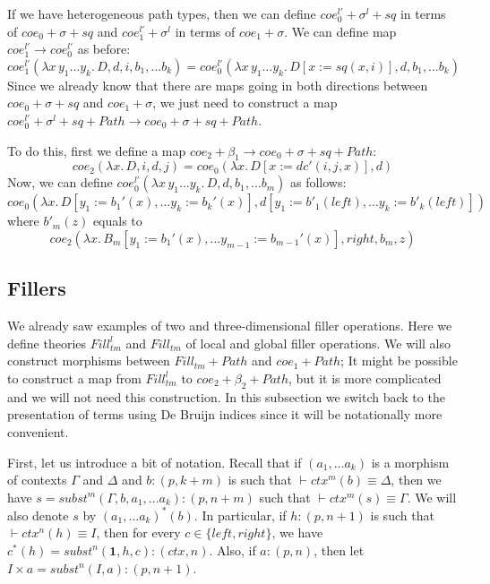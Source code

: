 \documentclass{mscs}
\newcommand{\deq}{\equiv}
\newcommand{\repl}{:=}
\newcommand{\emptyCtx}{\mathbf{1}}
\numberwithin{figure}{section}
\begin{document}
If we have heterogeneous path types, then we can define $coe^{l'}_0 + \sigma^l + sq$ in terms of $coe_0 + \sigma + sq$ and $coe^{l'}_1 + \sigma^l$ in terms of $coe_1 + \sigma$.
We can define map $coe^{l'}_1 \to coe^{l'}_0$ as before:
\[ coe^{l'}_1(\lambda x\,y_1 \ldots y_k.\,D, d, i, b_1, \ldots b_k) = coe^{l'}_0(\lambda x\,y_1 \ldots y_k.\,D[x \repl sq(x,i)], d, b_1, \ldots b_k) \]
Since we already know that there are maps going in both directions between $coe_0 + \sigma + sq$ and $coe_1 + \sigma$,
we just need to construct a map $coe^{l'}_0 + \sigma^l + sq + Path \to coe_0 + \sigma + sq + Path$.

To do this, first we define a map $coe_2 + \beta_1 \to coe_0 + \sigma + sq + Path$:
\[ coe_2(\lambda x.\,D, i, d, j)  = coe_0(\lambda x.\,D[x \repl dc'(i,j,x)], d) \]
Now, we can define $coe^{l'}_0(\lambda x\,y_1 \ldots y_k.\,D, d, b_1, \ldots b_m)$ as follows:
\[ coe_0(\lambda x.\,D[y_1 \repl b_1'(x), \ldots y_k \repl b_k'(x)], d[y_1 \repl b'_1(left), \ldots y_k \repl b'_k(left)]) \]
where $b'_m(z)$ equals to
\[ coe_2(\lambda x.\,B_m[y_1 \repl b_1'(x), \ldots y_{m-1} \repl b_{m-1}'(x)], right, b_m, z) \]

\subsection{Fillers}
\label{sec:fillers}

We already saw examples of two and three-dimensional filler operations.
Here we define theories $Fill^l_{tm}$ and $Fill_{tm}$ of local and global filler operations.
We will also construct morphisms between $Fill_{tm} + Path$ and $coe_1 + Path$;
It might be possible to construct a map from $Fill^l_{tm}$ to $coe_2 + \beta_2 + Path$, but it is more complicated and we will not need this construction.
In this subsection we switch back to the presentation of terms using De Bruijn indices since it will be notationally more convenient.

First, let us introduce a bit of notation.
Recall that if $(a_1, \ldots a_k)$ is a morphism of contexts $\Gamma$ and $\Delta$ and $b : (p,k+m)$ is such that $\vdash ctx^m(b) \deq \Delta$,
then we have $s = subst^m(\Gamma, b, a_1, \ldots a_k) : (p,n+m)$ such that $\vdash ctx^m(s) \deq \Gamma$.
We will also denote $s$ by $(a_1, \ldots a_k)^*(b)$.
In particular, if $h : (p,n+1)$ is such that $\vdash ctx^n(h) \deq I$, then for every $c \in \{ left, right \}$, we have $c^*(h) = subst^n(\emptyCtx, h, c) : (ctx,n)$.
Also, if $a : (p,n)$, then let $I \times a = subst^n(I, a) : (p,n+1)$.
\end{document}
